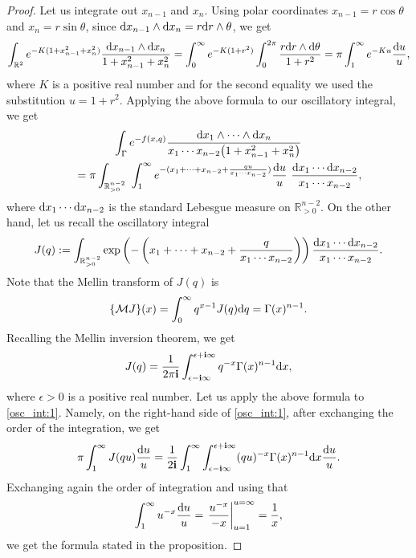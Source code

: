 \documentclass[pdftex]{sigma}
\numberwithin{equation}{section}
\newcommand{\RR}{\mathbb{R}}
\newcommand{\ii}{\mathbf{i}}
\begin{document}
\begin{proof}
Let us integrate out $x_{n-1}$ and $x_{n}$. Using polar coordinates
$x_{n-1}= r \cos \theta$ and $x_n=r\sin \theta$, since ${\rm d}x_{n-1}\wedge
{\rm d}x_n=r {\rm d}r\wedge\theta$, we get
\[
\int_{\RR^2} e^{-K (1+x_{n-1}^2+x_n^2)}
\frac{{\rm d}x_{n-1}\wedge {\rm d}x_n}{
1+x_{n-1}^2+x_n^2} =
\int_0^\infty e^{-K(1+r^2)}\int_{0}^{2\pi}
\frac{r {\rm d}r\wedge {\rm d}\theta }{1+r^2} =
\pi \int_1^\infty e^{-Ku} \frac{{\rm d}u}{u},
\]
where $K$ is a positive real number and for the second equality we used
the substitution $u=1+r^2$. Applying the above formula to our
oscillatory integral, we get
\begin{gather}
\int_{\Gamma} e^{-f(x,q)}
\frac{{\rm d}x_1\wedge \cdots \wedge {\rm d}x_n}{
x_1\cdots x_{n-2} \big(1+x_{n-1}^2+x_n^2\big) }\nonumber\\
\qquad = \pi
\int_{\RR^{n-2}_{>0}} \ \int_1^\infty
e^{-(
x_1+\cdots + x_{n-2} + \frac{q u}{ x_1\cdots x_{n-2}} )}
\frac{{\rm d}u}{u}\ \frac{{\rm d}x_1\cdots {\rm d}x_{n-2}}{x_1\cdots x_{n-2}},\label{osc_int:1}
\end{gather}
where ${\rm d}x_1\cdots {\rm d}x_{n-2}$ is the standard Lebesgue measure on
$\RR^{n-2}_{>0}$. On the other hand, let us recall the oscillatory
integral
\[
J(q):= \int_{\RR^{n-2}_{>0}}
\exp\left( -\left(
x_1+\cdots + x_{n-2} + \frac{q}{x_1\cdots x_{n-2}}
\right) \right) \frac{{\rm d}x_1\cdots {\rm d}x_{n-2}}{x_1\cdots x_{n-2}}.
\]
Note that the Mellin transform of $J(q)$ is
\[
\{\mathcal{M}J\}(x) = \int_0^\infty q^{x-1} J(q) {\rm d}q = \Gamma(x)^{n-1}.
\]
Recalling the Mellin inversion theorem, we get
\[
J(q) = \frac{1}{2\pi \ii} \int_{\epsilon-\ii\infty}^{\epsilon+\ii\infty} q^{-x}
\Gamma(x)^{n-1} {\rm d}x,
\]
where $\epsilon>0$ is a positive real number. Let us apply the above
formula to \eqref{osc_int:1}. Namely, on the right-hand side of \eqref{osc_int:1},
after exchanging the order of the integration, we get
\[
\pi \int_1^\infty J(qu) \frac{{\rm d}u}{u} = \frac{1}{2\ii}
\int_1^\infty
\int_{\epsilon-\ii\infty}^{\epsilon+\ii\infty} (q u) ^{-x}
\Gamma(x)^{n-1} {\rm d}x \frac{{\rm d}u}{u}.
\]
Exchanging again the order of integration and using that
\[
\int_1^\infty u^{-x} \frac{{\rm d}u}{u} = \left.
\frac{u^{-x} }{-x}\right|^{u=\infty}_{u=1} = \frac{1}{x},
\]
we get the formula stated in the proposition.
\end{proof}
\end{document}
